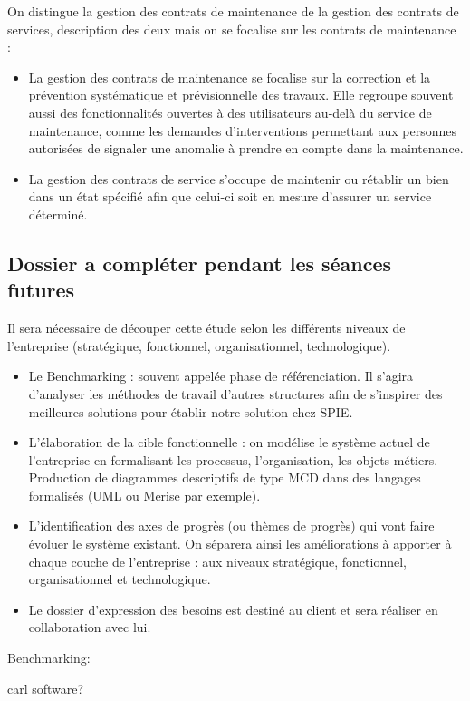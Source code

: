 On distingue la gestion des contrats de maintenance de la gestion des contrats de services, description des deux mais on se focalise sur les contrats de maintenance :

\begin{itemize}
\item La gestion des contrats de maintenance se focalise sur la correction et la prévention systématique et prévisionnelle des travaux. Elle regroupe souvent aussi des fonctionnalités ouvertes à des utilisateurs au-delà du service de maintenance, comme les demandes d’interventions permettant aux personnes autorisées de signaler une anomalie à prendre en compte dans la maintenance.
\item La gestion des contrats de service s’occupe de maintenir ou rétablir un bien dans un état spécifié afin que celui-ci soit en mesure d’assurer un service déterminé.
\end{itemize}

\subsection{Dossier a compléter pendant les séances futures}

Il sera nécessaire de découper cette étude selon les différents niveaux de l’entreprise (stratégique, fonctionnel, organisationnel, technologique).

\begin{itemize}
\item Le Benchmarking : souvent appelée phase de référenciation. Il s’agira d’analyser les méthodes de travail d’autres structures afin de s’inspirer des meilleures solutions pour établir notre solution chez SPIE.
\item L’élaboration de la cible fonctionnelle : on modélise le système actuel de l’entreprise en formalisant les processus, l’organisation, les objets métiers. Production de diagrammes descriptifs de type MCD dans des langages formalisés (UML ou Merise par exemple).
\item L’identification des axes de progrès (ou thèmes de progrès) qui vont faire évoluer le système existant. On séparera ainsi les améliorations à apporter à chaque couche de l’entreprise : aux niveaux stratégique, fonctionnel, organisationnel et technologique.
\item Le dossier d’expression des besoins est destiné au client et sera réaliser en collaboration avec lui.
\end{itemize}


Benchmarking:

carl software?
